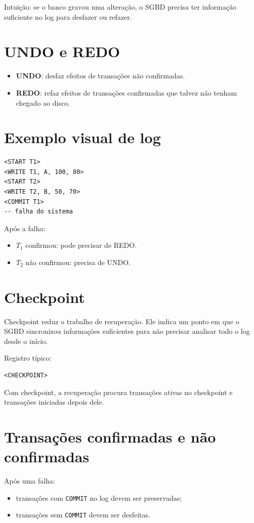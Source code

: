 \documentclass[12pt,a4paper]{article}
\begin{document}
Intuição: se o banco gravou uma alteração, o SGBD precisa ter informação suficiente no log para desfazer ou refazer.

\section{UNDO e REDO}
\begin{itemize}
    \item \textbf{UNDO}: desfaz efeitos de transações não confirmadas.
    \item \textbf{REDO}: refaz efeitos de transações confirmadas que talvez não tenham chegado ao disco.
\end{itemize}

\section{Exemplo visual de log}
\begin{verbatim}
<START T1>
<WRITE T1, A, 100, 80>
<START T2>
<WRITE T2, B, 50, 70>
<COMMIT T1>
-- falha do sistema
\end{verbatim}

Após a falha:
\begin{itemize}
    \item $T_1$ confirmou: pode precisar de REDO.
    \item $T_2$ não confirmou: precisa de UNDO.
\end{itemize}

\section{Checkpoint}
Checkpoint reduz o trabalho de recuperação. Ele indica um ponto em que o SGBD sincronizou informações suficientes para não precisar analisar todo o log desde o início.

Registro típico:
\begin{verbatim}
<CHECKPOINT>
\end{verbatim}

Com checkpoint, a recuperação procura transações ativas no checkpoint e transações iniciadas depois dele.

\section{Transações confirmadas e não confirmadas}
Após uma falha:
\begin{itemize}
    \item transações com \texttt{COMMIT} no log devem ser preservadas;
    \item transações sem \texttt{COMMIT} devem ser desfeitas.
\end{itemize}
\end{document}
